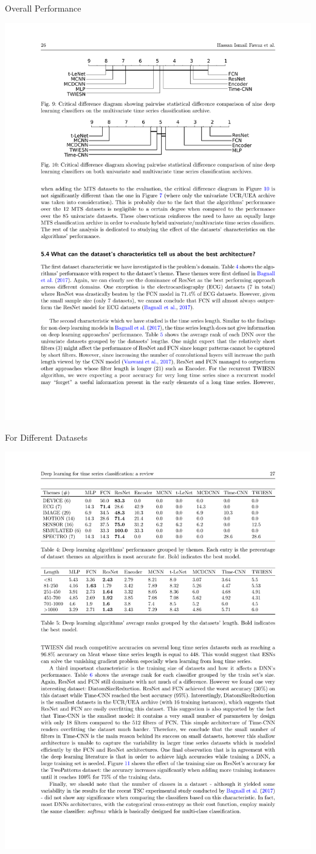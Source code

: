 \documentclass[aspectratio=169]{ctexbeamer}
\begin{document}
\begin{frame}{Overall Performance}
{{\begin{description}[leftmargin=!]
		\item[both] \includegraphics[width =.7\textwidth]{figure/both_cd}
	\end{description}}}
\end{frame}

\begin{frame}{For Different Datasets}
	\begin{center}
		\includegraphics[width=\textwidth]{figure/theme}
	\end{center}
\end{frame}
\end{document}

